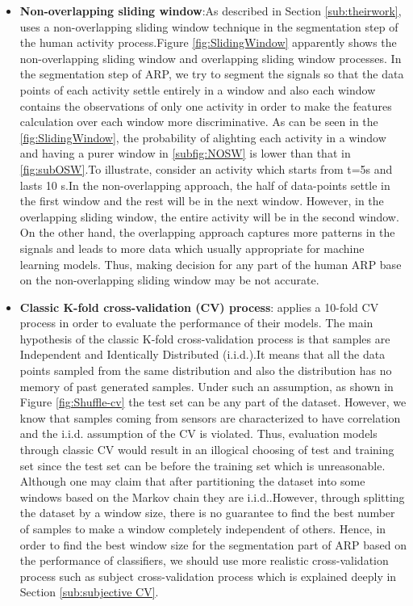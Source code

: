\begin{itemize}
\item \textbf{Non-overlapping sliding window}:As described in Section \ref{sub:theirwork}, \cite{banos2014window} uses a non-overlapping sliding window technique in the segmentation step of the human activity process.Figure \ref{fig:SlidingWindow} apparently shows the non-overlapping sliding window and overlapping sliding window processes. In the segmentation step of ARP, we try to segment the signals so that the data points of each activity settle entirely in a window and also each window contains the observations of only one activity in order to make the features calculation over each window more discriminative.
As can be seen in the \ref{fig:SlidingWindow}, the probability of alighting each activity in a window and having a purer window in \ref{subfig:NOSW} is lower than that in \ref{fig:subOSW}.To illustrate, consider an activity which starts from t=5s and lasts 10 s.In the non-overlapping approach, the half of data-points settle in the first window and the rest will be in the next window. However, in the overlapping sliding window, the entire activity will be in the second window. On the other hand, the overlapping approach captures more patterns in the signals and leads to more data which usually appropriate for machine learning models. Thus, making decision for any part of the human ARP base on the non-overlapping sliding window may be not accurate.\newline


\item \textbf{Classic K-fold cross-validation (CV) process}:
\cite{banos2014window} applies a 10-fold CV process in order to evaluate the performance of their models.
The main hypothesis of the classic K-fold cross-validation process is that samples are Independent and Identically Distributed (i.i.d.).It means that all the data points sampled from the same distribution and also the distribution has no memory of past generated samples. Under such an assumption, as shown in Figure \ref{fig:Shuffle-cv} the test set can be any part of the dataset. However, we know that samples coming from sensors are characterized to have correlation and the i.i.d. assumption of the CV is violated. Thus, evaluation models through classic CV would result in an illogical choosing of test and training set since the test set can be before the training set which is unreasonable. Although one may claim that after partitioning the dataset into some windows based on the Markov chain \cite{gilks1995markov} they are i.i.d..However, through splitting the dataset by a window size, there is no guarantee to find the best number of samples to make a window completely independent of others. Hence, in order to find the best window size for the segmentation part of ARP based on the performance of classifiers, we should use more realistic cross-validation process such as subject cross-validation process which is explained deeply in Section \ref{sub:subjective CV}.


\end{itemize}
